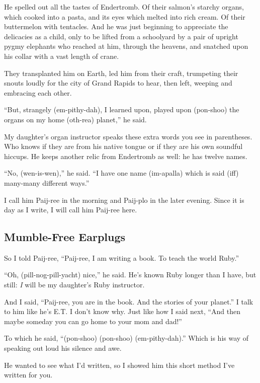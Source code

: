 \documentclass[12pt,twoside]{report}
\begin{document}
He spelled out all the tastes of Endertromb.  Of their salmon's
starchy organs, which cooked into a pasta, and its eyes which melted
into rich cream.  Of their buttermelon with tentacles. And he was just
beginning to appreciate the delicacies as a child, only to be lifted
from a schoolyard by a pair of upright pygmy elephants who reached at
him, through the heavens, and snatched upon his collar with a vast
length of crane.

They transplanted him on Earth, led him from their craft, trumpeting
their snouts loudly for the city of Grand Rapids to hear, then left,
weeping and embracing each other.

``But, strangely (em-pithy-dah), I learned upon, played upon
(pon-shoo) the organs on my home (oth-rea) planet,'' he said.

My daughter's organ instructor speaks these extra words you see in
parentheses.  Who knows if they are from his native tongue or if they
are his own soundful hiccups.  He keeps another relic from Endertromb
as well: he has twelve names.

``No, (wen-is-wen),'' he said.  ``I have one name (im-apalla) which is
said (iff) many-many different ways.''

I call him Paij-ree in the morning and Paij-plo in the later
evening. Since it is day as I write, I will call him Paij-ree here.



\subsection{Mumble-Free Earplugs}




So I told Paij-ree, ``Paij-ree, I am writing a book.  To teach the
world Ruby.''

``Oh, (pill-nog-pill-yacht) nice,'' he said.  He's known Ruby longer
than I have, but still: {\em I} will be my daughter's Ruby instructor.

And I said, ``Paij-ree, you are in the book.  And the stories of your
planet.''  I talk to him like he's E.T.  I don't know why.  Just like
how I said next, ``And then maybe someday you can go home to your mom
and dad!''

To which he said, ``(pon-shoo) (pon-shoo) (em-pithy-dah).''  Which is
his way of speaking out loud his silence and awe.

He wanted to see what I'd written, so I showed him this short method
I've written for you.
\end{document}
